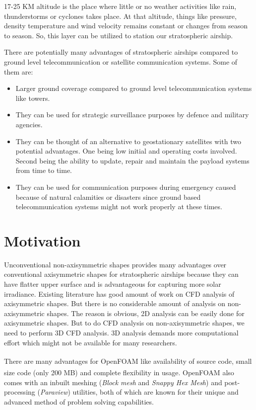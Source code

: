 17-25 KM altitude is the place where little or no weather activities like rain, thunderstorms or cyclones takes place. At that altitude, things like pressure, density temperature and wind velocity remains constant or changes from season to season. So, this layer can be utilized to station our stratospheric airship.

 There are potentially many advantages of stratospheric airships compared to ground level telecommunication or satellite communication systems. Some of them are:
 
 \begin{itemize}
 	\item Larger ground coverage compared to ground level telecommunication systems like towers.
 	\item They can be used for strategic surveillance purposes by defence and military agencies.
 	\item They can be thought of an alternative to geostationary satellites with two potential advantages. One being low initial and operating costs involved. Second being the ability to update, repair and maintain the payload systems from time to time.
 	\item They can be used for communication purposes during emergency caused because of natural calamities or disasters since ground based telecommunication systems might not work properly at these times.
 \end{itemize}
 
\section{Motivation}

Unconventional non-axisymmetric shapes provides many advantages over conventional axisymmetric shapes for stratospheric airships because they can have flatter upper surface and is advantageous for capturing more solar irradiance. Existing literature has good amount of work on CFD analysis of axisymmetric shapes. But there is no considerable amount of analysis on non-axisymmetric shapes. The reason is obvious, 2D analysis can be easily done for axisymmetric shapes. But to do CFD analysis on non-axisymmetric shapes, we need to perform 3D CFD analysis. 3D analysis demands more computational effort which might not be available for many researchers.

There are many advantages for OpenFOAM\textsuperscript{\textregistered} like availability of source code, small size code (only 200 MB) and complete flexibility in usage. OpenFOAM\textsuperscript{\textregistered} also comes with an inbuilt meshing (\textit{Block mesh} and \textit{Snappy Hex Mesh}) and post-processing (\textit{Paraview}) utilities, both of which are known for their unique and advanced method of problem solving capabilities. \\

